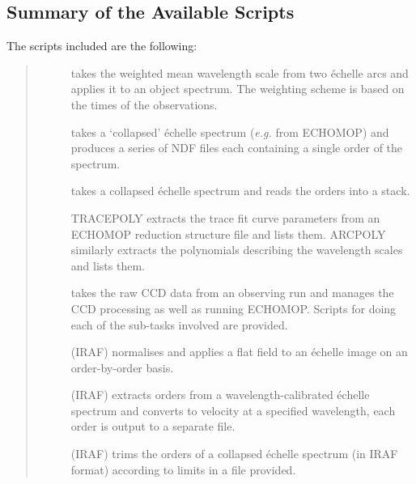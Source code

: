 \documentclass[twoside,11pt]{starlink}
\begin{document}
\scfrontmatter




\subsection*{Summary of the Available Scripts }

The scripts included are the following:

\begin{quote}
\begin{description}

\item []
      takes the weighted mean wavelength scale from
      two \'{e}chelle arcs and applies it to an object spectrum.
      The weighting scheme is based on the times of the observations.

\item []
      takes a `collapsed' \'{e}chelle spectrum ({\it{e.g.}}
      from ECHOMOP) and produces a series of NDF files each
      containing a single order of the spectrum.

\item []
      takes a collapsed \'{e}chelle spectrum and reads
      the orders into a  stack.

\item []
      TRACEPOLY extracts the trace fit curve parameters from an ECHOMOP
      reduction structure file and lists them.
      ARCPOLY similarly extracts the polynomials describing the
      wavelength scales and lists them.

\item []
      takes the raw CCD data from an
      observing run and manages the CCD processing as well as running
      ECHOMOP\@.  Scripts for doing each of the sub-tasks involved
      are provided.

\item []
      (IRAF) normalises and applies a flat field to an \'{e}chelle
      image on an order-by-order basis.

\item []
      (IRAF) extracts orders from a wavelength-calibrated
      \'{e}chelle spectrum and converts to velocity at a specified
      wavelength, each order is output to a separate file.

\item []
      (IRAF) trims the orders of a collapsed \'{e}chelle
      spectrum (in IRAF format) according to limits in a file provided.

\end{description}
\end{quote}
\end{document}
